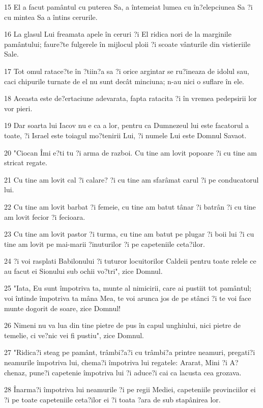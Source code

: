 \par 15 El a facut pamântul cu puterea Sa, a întemeiat lumea cu în?elepciunea Sa ?i cu mintea Sa a întins cerurile.
\par 16 La glasul Lui freamata apele în ceruri ?i El ridica nori de la marginile pamântului; faure?te fulgerele în mijlocul ploii ?i scoate vânturile din vistieriile Sale.
\par 17 Tot omul ratace?te în ?tiin?a sa ?i orice argintar se ru?ineaza de idolul sau, caci chipurile turnate de el nu sunt decât minciuna; n-au nici o suflare în ele.
\par 18 Aceasta este de?ertaciune adevarata, fapta ratacita ?i în vremea pedepsirii lor vor pieri.
\par 19 Dar soarta lui Iacov nu e ca a lor, pentru ca Dumnezeul lui este facatorul a toate, ?i Israel este toiagul mo?tenirii Lui, ?i numele Lui este Domnul Savaot.
\par 20 "Ciocan Îmi e?ti tu ?i arma de razboi. Cu tine am lovit popoare ?i cu tine am stricat regate.
\par 21 Cu tine am lovit cal ?i calare? ?i cu tine am sfarâmat carul ?i pe conducatorul lui.
\par 22 Cu tine am lovit barbat ?i femeie, cu tine am batut tânar ?i batrân ?i cu tine am lovit fecior ?i fecioara.
\par 23 Cu tine am lovit pastor ?i turma, cu tine am batut pe plugar ?i boii lui ?i cu tine am lovit pe mai-marii ?inuturilor ?i pe capeteniile ceta?ilor.
\par 24 ?i voi rasplati Babilonului ?i tuturor locuitorilor Caldeii pentru toate relele ce au facut ei Sionului sub ochii vo?tri", zice Domnul.
\par 25 "Iata, Eu sunt împotriva ta, munte al nimicirii, care ai pustiit tot pamântul; voi întinde împotriva ta mâna Mea, te voi arunca jos de pe stânci ?i te voi face munte dogorit de soare, zice Domnul!
\par 26 Nimeni nu va lua din tine pietre de pus în capul unghiului, nici pietre de temelie, ci ve?nic vei fi pustiu", zice Domnul.
\par 27 "Ridica?i steag pe pamânt, trâmbi?a?i cu trâmbi?a printre neamuri, pregati?i neamurile împotriva lui, chema?i împotriva lui regatele: Ararat, Mini ?i A?chenaz, pune?i capetenie împotriva lui ?i aduce?i cai ca lacusta cea grozava.
\par 28 Înarma?i împotriva lui neamurile ?i pe regii Mediei, capeteniile provinciilor ei ?i pe toate capeteniile ceta?ilor ei ?i toata ?ara de sub stapânirea lor.
